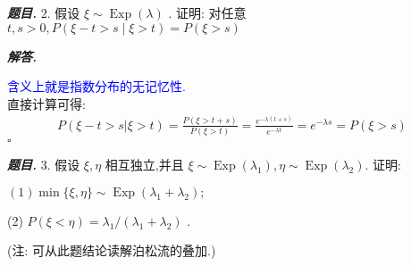 \documentclass[10pt, a4paper, oneside]{ctexart}
\newenvironment{problem}{\begin{framed}\par\noindent\textbf{\textit{题目. }}}{\end{framed}\par}
\newenvironment{solution}{%
  \par\noindent\textbf{\textit{解答. }}\ignorespaces
}{%
  \hfill\ensuremath{\square}\par %
}
\begin{document}
\begin{problem}
    \( 2. \) 假设 \( \xi  \sim  \operatorname{Exp}\left( \lambda \right)  \) . 证明: 对任意 \( t,s > 0,P\left( {\xi  - t > s \mid  \xi  > t}\right)  =  P(\xi>s)\) 
\end{problem}
\begin{solution}
    \textcolor{blue}{含义上就是指数分布的无记忆性.}\\ 直接计算可得:
    \begin{align*}
        P(\xi-t>s|\xi>t)=\frac{P(\xi>t+s)}{P(\xi>t)}=\frac{e^{-\lambda(t+s)}}{e^{-\lambda t}}=e^{-\lambda s}=P(\xi>s)
    \end{align*}
\end{solution}

\begin{problem}
    3.\( \text{ 假设 }\xi ,\eta \text{ 相互独立,并且 }\xi  \sim  \operatorname{Exp}\left( {\lambda }_{1}\right) ,\eta  \sim  \operatorname{Exp}\left( {\lambda }_{2}\right) .\text{ 证明: }  \)

\( \left( 1\right) \min \{ \xi ,\eta \}  \sim  \operatorname{Exp}\left( {{\lambda }_{1} + {\lambda }_{2}}\right) ; \)

(2) \( P\left( {\xi  < \eta }\right)  = {\lambda }_{1}/\left( {{\lambda }_{1} + {\lambda }_{2}}\right)  \) .

(注: 可从此题结论读解泊松流的叠加.)
\end{problem}
\end{document}
